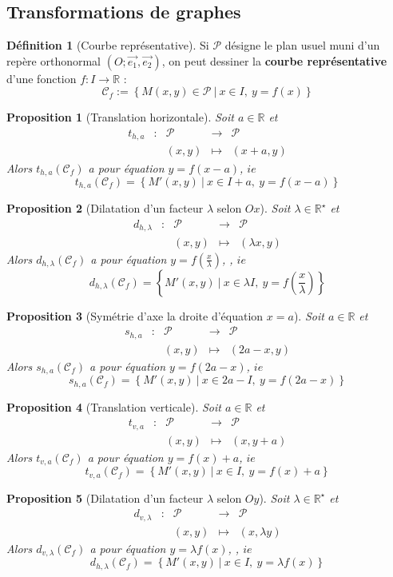 \documentclass[french]{book}
\newcommand{\R}{\mathbb{R}}
\newcommand{\st}{^\star}
\theoremstyle{plain}
\newtheorem{prop}{Proposition}[chapter]
\theoremstyle{definition}
\newtheorem{dfn}{Définition}[chapter]
\theoremstyle{remark}
\begin{document}
\subsection{Transformations de graphes}
\begin{dfn}[Courbe représentative]
	Si $\mathcal{P}$ désigne le plan usuel muni d'un repère orthonormal $(O ; \overrightarrow{e_1},\overrightarrow{e_2})$, on peut dessiner la \textbf{courbe représentative} d'une fonction $f:I\rightarrow\R$ : $$\mathcal{C}_f:=\left\{M(x,y)\in\mathcal{P}\ | \ x\in I,\ y=f(x)\right\}$$
\end{dfn}
\begin{prop}[Translation horizontale]
	Soit $a\in\R$ et $$\begin{array}{ccccc}t_{h,a}&:&\mathcal{P}&\rightarrow&\mathcal{P}\\&&(x,y)&\mapsto&(x+a,y)\end{array}$$ Alors $t_{h,a}(\mathcal{C}_f)$ a pour équation $y=f(x-a)$, $ie$ $$t_{h,a}(\mathcal{C}_f)=\left\{M'(x,y)\ | \ x\in I+a,\ y=f(x-a)\right\}$$
\end{prop}
\begin{prop}[Dilatation d'un facteur $\lambda$ selon $Ox$]
		Soit $\lambda\in\R\st$ et $$\begin{array}{ccccc}d_{h,\lambda}&:&\mathcal{P}&\rightarrow&\mathcal{P}\\&&(x,y)&\mapsto&(\lambda x,y)\end{array}$$ Alors $d_{h,\lambda}(\mathcal{C}_f)$ a pour équation $y=f\left(\frac{x}{\lambda}\right)$, , $ie$ $$d_{h,\lambda}(\mathcal{C}_f)=\left\{M'(x,y)\ | \ x\in \lambda I,\ y=f\left(\frac{x}{\lambda}\right)\right\}$$
\end{prop}
\begin{prop}[Symétrie d'axe la droite d'équation $x=a$]
	Soit $a\in\R$ et $$\begin{array}{ccccc}s_{h,a}&:&\mathcal{P}&\rightarrow&\mathcal{P}\\&&(x,y)&\mapsto&(2a-x,y)\end{array}$$ Alors $s_{h,a}(\mathcal{C}_f)$ a pour équation $y=f(2a-x)$, $ie$ $$s_{h,a}(\mathcal{C}_f)=\left\{M'(x,y)\ | \ x\in 2a-I,\ y=f(2a-x)\right\}$$
\end{prop}
\begin{prop}[Translation verticale]
	Soit $a\in\R$ et $$\begin{array}{ccccc}t_{v,a}&:&\mathcal{P}&\rightarrow&\mathcal{P}\\&&(x,y)&\mapsto&(x,y+a)\end{array}$$ Alors $t_{v,a}(\mathcal{C}_f)$ a pour équation $y=f(x)+a$, $ie$ $$t_{v,a}(\mathcal{C}_f)=\left\{M'(x,y)\ | \ x\in I,\ y=f(x)+a\right\}$$
\end{prop}\begin{prop}[Dilatation d'un facteur $\lambda$ selon $Oy$]
Soit $\lambda\in\R\st$ et $$\begin{array}{ccccc}d_{v,\lambda}&:&\mathcal{P}&\rightarrow&\mathcal{P}\\&&(x,y)&\mapsto&(x,\lambda y)\end{array}$$ Alors $d_{v,\lambda}(\mathcal{C}_f)$ a pour équation $y=\lambda f\left(x\right)$, , $ie$ $$d_{h,\lambda}(\mathcal{C}_f)=\left\{M'(x,y)\ | \ x\in I,\ y=\lambda f\left(x\right)\right\}$$
\end{prop}
\end{document}
